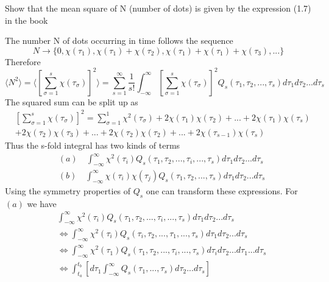 

Show that the mean square of N (number of dots) is given by the expression (1.7) in the book

The number N of dots occurring in time follows the sequence
\begin{equation}
N \rightarrow \{0,\chi(\tau_1),\chi(\tau_1)+\chi(\tau_2),\chi(\tau_1)+\chi(\tau_1)+\chi(\tau_3),...\}
\end{equation}
Therefore
\begin{equation}
\langle N^2\rangle=\langle \left[\sum_{\sigma=1}^s \chi(\tau_{\sigma})\right]^2\rangle=\sum_{s=1}^{\infty}\frac{1}{s!}\int_{-\infty}^{\infty}\left[\sum_{\sigma=1}^s \chi(\tau_{\sigma})\right]^2Q_s(\tau_1,\tau_2,...,\tau_s)d\tau_1d\tau_2...d\tau_s
\end{equation}
The squared sum can be split up as
\begin{equation}
\begin{split}
&\left[ \sum_{\sigma=1}^s \chi(\tau_{\sigma}) \right]^2=\sum_{\sigma=1}^1 \chi^2(\tau_{\sigma})+2\chi(\tau_{1})\chi(\tau_{2})+...+2\chi(\tau_{1})\chi(\tau_{s})\\
&+2\chi(\tau_{2})\chi(\tau_{3})+...+2\chi(\tau_{2})\chi(\tau_{2})+...+2\chi(\tau_{s-1})\chi(\tau_{s})
\end{split}
\end{equation}
Thus the s-fold integral has two kinds of terms
\begin{equation}
\begin{split}
&(a)\quad \int_{-\infty}^{\infty}\chi^2(\tau_i)Q_s(\tau_1,\tau_2,...,\tau_i,...,\tau_s)d\tau_1d\tau_2...d\tau_s\\
&(b) \quad \int_{-\infty}^{\infty}\chi(\tau_i)\chi(\tau_j)Q_s(\tau_1,\tau_2,...,\tau_s)d\tau_1d\tau_2...d\tau_s 
\end{split}
\end{equation}
Using the symmetry properties of $Q_s$ one can transform these expressions. For $(a)$ we have
\begin{equation}
\begin{split}
& \int_{-\infty}^{\infty}\chi^2(\tau_i)Q_s(\tau_1,\tau_2,...,\tau_i,...,\tau_s)d\tau_1d\tau_2...d\tau_s\\
& \Leftrightarrow \int_{-\infty}^{\infty}\chi^2(\tau_i)Q_s(\tau_i,\tau_2,...,\tau_1,...,\tau_s)d\tau_1d\tau_2...d\tau_s \\
& \Leftrightarrow \int_{-\infty}^{\infty}\chi^2(\tau_1)Q_s(\tau_1,\tau_2,...,\tau_i,...,\tau_s)d\tau_id\tau_2...d\tau_1...d\tau_s \\
& \Leftrightarrow\int_{t_a}^{t_b}\left[d\tau_1 \int_{-\infty}^{\infty}Q_s(\tau_1,...,\tau_s)d\tau_2...d\tau_s \right]
\end{split}
\end{equation}
